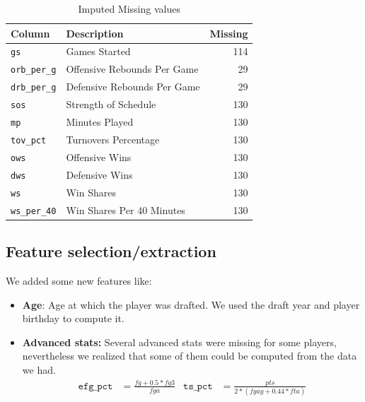 \begin{table}[htb]
  \centering
  \caption{Imputed Missing values}%
  \label{tab:missing-values}
  \begin{tabular}{llr}
    \toprule
    \textbf{Column} & \textbf{Description} & \textbf{Missing} \\
    \midrule
    \texttt{gs}          & Games Started               & 114 \\
    \texttt{orb\_per\_g} & Offensive Rebounds Per Game & 29  \\
    \texttt{drb\_per\_g} & Defensive Rebounds Per Game & 29  \\
    \texttt{sos}         & Strength of Schedule        & 130 \\
    \texttt{mp}          & Minutes Played              & 130 \\
    \texttt{tov\_pct}    & Turnovers Percentage        & 130 \\
    \texttt{ows}         & Offensive Wins              & 130 \\
    \texttt{dws}         & Defensive Wins              & 130 \\
    \texttt{ws}          & Win Shares                  & 130 \\
    \texttt{ws\_per\_40} & Win Shares Per 40 Minutes   & 130 \\
    \bottomrule
  \end{tabular}
\end{table}

\subsection{Feature selection/extraction}%
\label{sub:feature-selection}

We added some new features like:
\begin{itemize}
    \item \textbf{Age}: Age at which the player was drafted. We used the draft year and player birthday to compute it.
    \item \textbf{Advanced stats:} Several advanced stats were missing for some players, nevertheless we realized that some of them could be computed from the data we had.
    \begin{align*}
    \texttt{efg\_pct} &= \frac{fg + 0.5 * fg3}{fga} & \texttt{ts\_pct} &= \frac{pts}{2*(fgag + 0.44*fta)} \\
    \end{align*}
\end{itemize}

